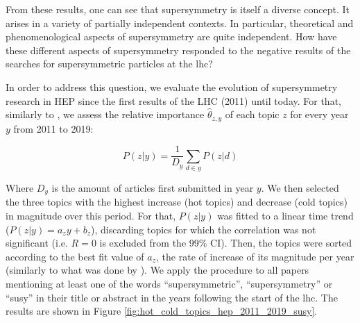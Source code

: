 \documentclass[smallextended]{svjour3}
\begin{document}
From these results, one can see that supersymmetry is itself a diverse concept. It arises in a variety of partially independent contexts. In particular, theoretical and phenomenological aspects of supersymmetry are quite independent. How have these different aspects of supersymmetry responded to the negative results of the searches for supersymmetric particles at the \gls{lhc}?

In order to address this question, we evaluate the evolution of supersymmetry research in HEP since the first results of the LHC (2011) until today. For that, similarly to \citet{Hall2008}, we assess the relative importance $\hat{\theta}_{z,y}$ of each topic $z$ for every year $y$ from 2011 to 2019:

\begin{equation}
P(z|y) = \dfrac{1}{D_y}\sum_{d\in y} P(z|d)   
\end{equation}

Where $D_y$ is the amount of articles first submitted in year $y$. We then selected the three topics with the highest increase (hot topics) and decrease (cold topics) in magnitude over this period. For that, $P(z|y)$ was fitted to a linear time trend ($P(z|y) = a_zy+b_z$), discarding topics for which the correlation was not significant (i.e. $R=0$ is excluded from the 99\% CI). Then, the topics were sorted according to the best fit value of $a_z$, the rate of increase of its magnitude per year (similarly to what was done by \citealt{Griffiths2004}). We apply the procedure to  all papers mentioning at least one of the words ``supersymmetric'', ``supersymmetry'' or ``susy'' in their title or abstract in the years following the start of the \gls{lhc}. The results are shown in Figure  \ref{fig:hot_cold_topics_hep_2011_2019_susy}. 
\end{document}
